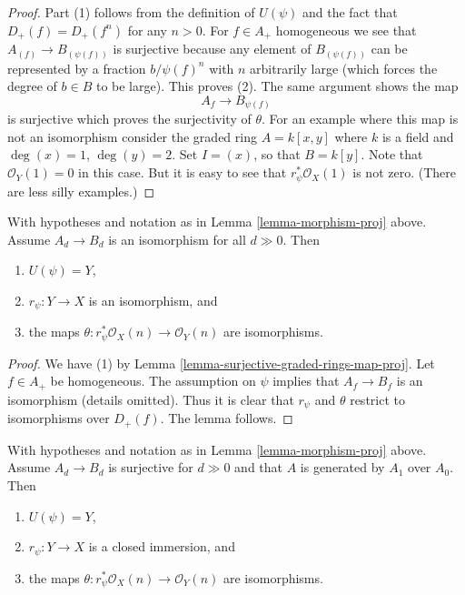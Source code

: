 \begin{proof}
Part (1) follows from the definition of $U(\psi)$ and the fact that
$D_{+}(f) = D_{+}(f^n)$ for any $n > 0$. For $f \in A_{+}$ homogeneous
we see that $A_{(f)} \to B_{(\psi(f))}$ is surjective because
any element of $B_{(\psi(f))}$ can be represented by a fraction
$b/\psi(f)^n$ with $n$ arbitrarily large (which forces the degree of
$b \in B$ to be large). This proves (2).
The same argument shows the map
$$
A_f \to B_{\psi(f)}
$$
is surjective which proves the surjectivity of $\theta$.
For an example where this map is not an isomorphism
consider the graded ring $A = k[x, y]$ where $k$ is a field
and $\deg(x) = 1$, $\deg(y) = 2$. Set $I = (x)$, so that
$B = k[y]$. Note that $\mathcal{O}_Y(1) = 0$ in this case.
But it is easy to see that $r_\psi^*\mathcal{O}_X(1)$
is not zero. (There are less silly examples.)
\end{proof}

\begin{lemma}
\label{lemma-eventual-iso-graded-rings-map-proj}
With hypotheses and notation as in Lemma \ref{lemma-morphism-proj} above.
Assume $A_d \to B_d$ is an isomorphism for all $d \gg 0$. Then
\begin{enumerate}
\item $U(\psi) = Y$,
\item $r_\psi : Y \to X$ is an isomorphism, and
\item the maps $\theta : r_\psi^*\mathcal{O}_X(n) \to \mathcal{O}_Y(n)$
are isomorphisms.
\end{enumerate}
\end{lemma}

\begin{proof}
We have (1) by Lemma \ref{lemma-surjective-graded-rings-map-proj}.
Let $f \in A_{+}$ be homogeneous. The assumption on $\psi$ implies that
$A_f \to B_f$ is an isomorphism (details omitted). Thus it is clear that
$r_\psi$ and $\theta$ restrict to isomorphisms over $D_{+}(f)$.
The lemma follows.
\end{proof}

\begin{lemma}
\label{lemma-surjective-graded-rings-generated-degree-1-map-proj}
With hypotheses and notation as in Lemma \ref{lemma-morphism-proj} above.
Assume $A_d \to B_d$ is surjective for $d \gg 0$ and that $A$ is generated
by $A_1$ over $A_0$. Then
\begin{enumerate}
\item $U(\psi) = Y$,
\item $r_\psi : Y \to X$ is a closed immersion, and
\item the maps $\theta : r_\psi^*\mathcal{O}_X(n) \to \mathcal{O}_Y(n)$
are isomorphisms.
\end{enumerate}
\end{lemma}


